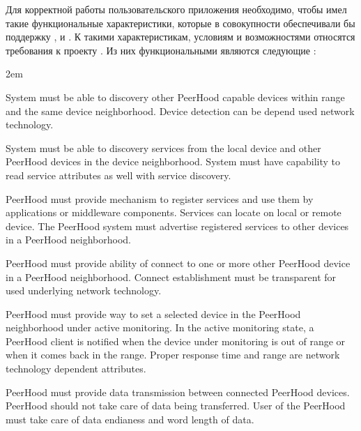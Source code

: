 \Sentence
Для корректной работы пользовательского приложения необходимо, чтобы \PeerHood имел такие 
функциональные характеристики, которые в совокупности обеспечивали бы поддержку 
,  и 
.
\Sentence
К такими характеристикам, условиям и возможностями относятся требования к проекту 
.
\Sentence
Из них функциональными являются следующие  
:
\begin{description}
	\leftskip2em%
	\setlength{\itemsep}{0pt}%
	\setlength{\parsep}{0pt}%

	\item[Device discovery] System must be able to discovery other PeerHood capable devices 
		within range and the same device neighborhood.
		\Sentence
		Device detection can be depend used network technology.
		\item[Service discovery] System must be able to discovery services from the local device 
		and other PeerHood devices in the device neighborhood.
		\Sentence
		System must have capability to read service attributes as well with service discovery.

	\item[Service sharing] PeerHood must provide mechanism to register services and use them by 
	applications or middleware components. 
	\Sentence
	Services can locate on local or remote device. 
	\Sentence
	The PeerHood system must advertise registered services to other devices in a PeerHood 
	neighborhood.

	\item[Connection establishment] PeerHood must provide ability of connect to one or more other 
	PeerHood device in a PeerHood neighborhood. 
	\Sentence
	Connect establishment must be transparent for used underlying network technology.

	\item[Active monitoring of a device] PeerHood must provide way to set a selected device in the 
	PeerHood neighborhood under active monitoring. 
	\Sentence
	In the active monitoring state, a PeerHood client is notified when the device under monitoring 
	is out of range or when it comes back in the range. 
	\Sentence
	Proper response time and range are network technology dependent attributes.

	\item[Data transmission between devices] PeerHood must provide data transmission between 
	connected PeerHood devices. 
	\Sentence
	PeerHood should not take care of data being transferred. 
	\Sentence
	User of the PeerHood must take care of data endianess and word length of data.


\end{description}
